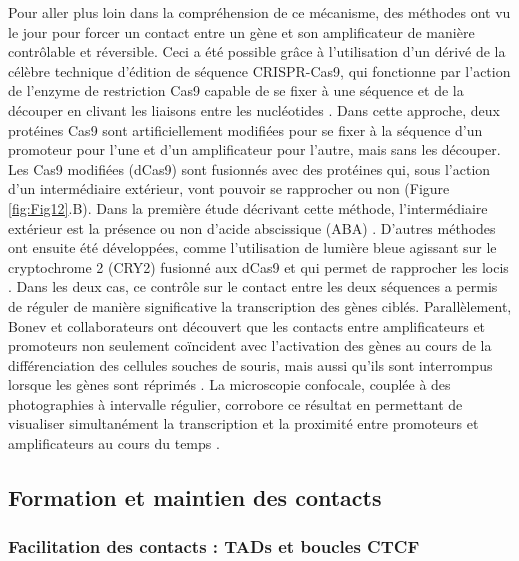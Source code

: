 Pour aller plus loin dans la compréhension de ce mécanisme, des méthodes ont vu le jour pour forcer un contact entre un gène et son \gls{amplificateur} de manière contrôlable et réversible. Ceci a été possible grâce à l’utilisation d’un dérivé de la célèbre technique d’édition de séquence CRISPR-Cas9, qui fonctionne par l’action de l’enzyme de restriction Cas9 capable de se fixer à une séquence et de la découper en clivant les liaisons entre les nucléotides \citep{doudna_new_2014}. Dans cette approche, deux protéines Cas9 sont artificiellement modifiées pour se fixer à la séquence d’un promoteur pour l’une et d’un \gls{amplificateur} pour l’autre, mais sans les découper. Les Cas9 modifiées (dCas9) sont fusionnés avec des protéines qui, sous l’action d’un intermédiaire extérieur, vont pouvoir se rapprocher ou non (Figure \ref{fig:Fig12}.B). Dans la première étude décrivant cette méthode, l’intermédiaire extérieur est la présence ou non d’acide abscissique (ABA) \citep{morgan_manipulation_2017}. D’autres méthodes ont ensuite été développées, comme l’utilisation de lumière bleue agissant sur le cryptochrome 2 (CRY2) fusionné aux dCas9 et qui permet de rapprocher les locis \citep{kim_ladl_2019}. Dans les deux cas, ce contrôle sur le contact entre les deux séquences a permis de réguler de manière significative la transcription des gènes ciblés. Parallèlement, Bonev et collaborateurs ont découvert que les contacts entre \glspl{amplificateur} et promoteurs non seulement coïncident avec l'activation des gènes au cours de la différenciation des cellules souches de souris, mais aussi qu'ils sont interrompus lorsque les gènes sont réprimés \citep{bonev_multiscale_2017}. La microscopie confocale, couplée à des photographies à intervalle régulier, corrobore ce résultat en permettant de visualiser simultanément la transcription et la proximité entre promoteurs et \glspl{amplificateur} au cours du temps \citep{chen_dynamic_2018}.

\subsection{Formation et maintien des contacts}
\label{subsec:formation-contact}
\subsubsection{Facilitation des contacts : \acrshort{TAD}s et boucles CTCF}
\label{subsubsec:TAD-boucle}

